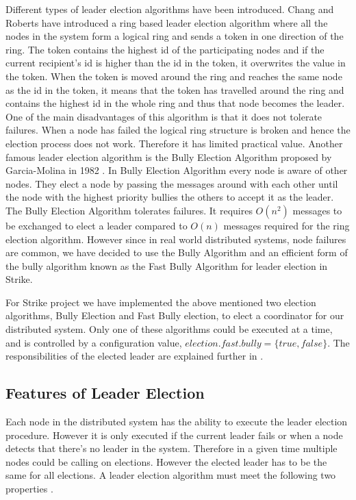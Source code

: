 \documentclass[dareport.tex]{subfiles}
\begin{document}
Different types of leader election algorithms have been introduced. Chang and Roberts have introduced a ring based leader election algorithm\cite{ChangRoberts-ringelection} where all the nodes in the system form a logical ring and sends a token in one direction of the ring. The token contains the highest id of the participating nodes and if the current recipient's id is higher than the id in the token, it overwrites the value in the token. When the token is moved around the ring and reaches the same node as the id in the token, it means that the token has travelled around the ring and contains the highest id in the whole ring and thus that node becomes the leader. One of the main disadvantages of this algorithm is that it does not tolerate failures. When a node has failed the logical ring structure is broken and hence the election process does not work. Therefore it has limited practical value. Another famous leader election algorithm is the Bully Election Algorithm proposed by Garcia-Molina in 1982 \cite{election}. In Bully Election Algorithm every node is aware of other nodes. They elect a node by passing the messages around with each other until the node with the highest priority bullies the others to accept it as the leader. The Bully Election Algorithm tolerates failures. It requires $ O(n^2) $ messages to be exchanged to elect a leader compared to $ O(n) $ messages required for the ring election algorithm. However since in real world distributed systems, node failures are common, we have decided to use the Bully Algorithm and an efficient form of the bully algorithm known as the Fast Bully Algorithm\cite{fastbully} for leader election in Strike. 

For Strike project we have implemented the above mentioned two election algorithms, Bully Election and Fast Bully election, to elect a coordinator for our distributed system. Only one of these algorithms could be executed at a time, and is controlled by a configuration value, $election.fast.bully=\{true, false\}$. The responsibilities of the elected leader are explained further in .

\subsection{Features of Leader Election}
Each node in the distributed system has the ability to execute the leader election procedure. However it is only executed if the current leader fails or when a node detects that there's no leader in the system. Therefore in a given time multiple nodes could be calling on elections. However the elected leader has to be the same for all elections. A leader election algorithm must meet the following two properties \cite{coulouris}.
\end{document}
